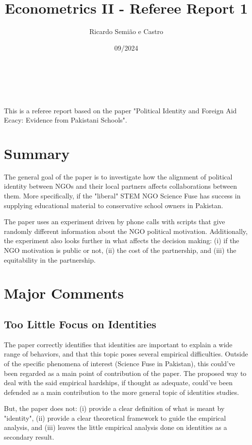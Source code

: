 \documentclass[12pt]{article}
\title{Econometrics II - Referee Report 1}
\author{Ricardo Semião e Castro}
\date{09/2024}
\makeatletter
\renewcommand{\maketitle}{
  \begin{center}
    {\Huge \@title}\\[2em]
    {\large \@author \hfill \@date}\\[2em]
  \end{center}
}
\makeatother
\begin{document}
\maketitle

This is a referee report based on the paper "Political Identity and Foreign Aid Ecacy: Evidence from Pakistani Schools".

\section{Summary}

The general goal of the paper is to investigate how the alignment of political identity between NGOs and their local partners affects collaborations between them. More specifically, if the "liberal" STEM NGO Science Fuse has success in supplying educational material to conservative school owners in Pakistan.

The paper uses an experiment driven by phone calls with scripts that give randomly different information about the NGO political motivation. Additionally, the experiment also looks further in what affects the decision making: (i) if the NGO motivation is public or not, (ii) the cost of the partnership, and (iii) the equitability in the partnership.


\section{Major Comments}

\subsection{Too Little Focus on Identities}

The paper correctly identifies that identities are important to explain a wide range of behaviors, and that this topic poses several empirical difficulties. Outside of the specific phenomena of interest (Science Fuse in Pakistan), this could've been regarded as a main point of contribution of the paper. The proposed way to deal with the said empirical hardships, if thought as adequate, could've been defended as a main contribution to the more general topic of identities studies.

But, the paper does not: (i) provide a clear definition of what is meant by "identity", (ii) provide a clear theoretical framework to guide the empirical analysis, and (iii) leaves the little empirical analysis done on identities as a secondary result.
\end{document}
